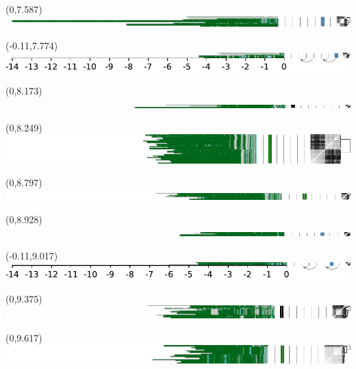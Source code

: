 \documentclass{article}
\begin{document}
\begin{textblock}{13}(0,7.587)\includegraphics{./Figure_S4/4ptel_1-500K_1_12_12-HG006.pdf}\end{textblock}
\begin{textblock}{13}(-0.11,7.774)\includegraphics{./Figure_S4/4ptel_1-500K_1_12_12-HG007.pdf}\end{textblock}
\begin{textblock}{13}(0,8.173)\includegraphics{./Figure_S4/chr5-HG001.pdf}\end{textblock}
\begin{textblock}{13}(0,8.249)\includegraphics{./Figure_S4/chr5-HG002.pdf}\end{textblock}
\begin{textblock}{13}(0,8.797)\includegraphics{./Figure_S4/chr5-HG003.pdf}\end{textblock}
\begin{textblock}{13}(0,8.928)\includegraphics{./Figure_S4/chr5-HG005.pdf}\end{textblock}
\begin{textblock}{13}(-0.11,9.017)\includegraphics{./Figure_S4/chr5-HG006.pdf}\end{textblock}
\begin{textblock}{13}(0,9.375)\includegraphics{./Figure_S4/chr9-HG001.pdf}\end{textblock}
\begin{textblock}{13}(0,9.617)\includegraphics{./Figure_S4/chr9-HG002.pdf}\end{textblock}
\end{document}
